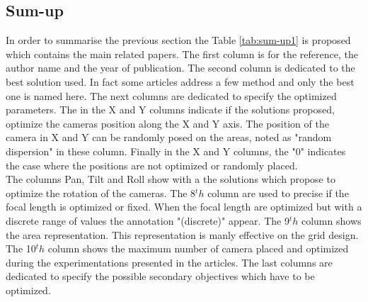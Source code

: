 %	
	
	
	 \subsection{Sum-up} 
	 In order to summarise the previous section the Table \ref{tab:sum-up1} is proposed which contains the main related papers. The first column is for the reference, the author name and the year of publication. The second column is dedicated to the best solution used. In fact some articles address a few method and only the best one is named here.
	 The next columns are dedicated to specify the optimized parameters. The  in the X and Y columns indicate  if the solutions proposed, optimize the cameras position along the X and Y axis. The position of the camera in X and Y can be randomly posed on the areas, noted as "random dispersion" in these column. Finally in the X and Y columns, the "0" indicates the case where the positions are not optimized or randomly placed.\\
	 The columns Pan, Tilt and Roll show with a  the solutions which propose to optimize the rotation of the cameras. The 8$^th$ column are used to precise if the focal length is optimized or fixed.  When the focal length are optimized but with a discrete  range of values the annotation "(discrete)" appear. The 9$^th$ column shows the area representation. This representation is manly effective on the grid design. The 10$^th$ column shows the maximum number of camera placed  and optimized during the experimentations presented in the articles. The last columns are dedicated to specify  the possible secondary objectives which have to be optimized.
